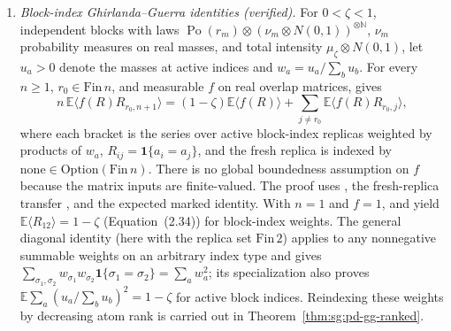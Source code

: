 \begin{remark}
\begin{enumerate}
\item \emph{Block-index Ghirlanda--Guerra identities (verified).} For $0<\zeta<1$, independent blocks with laws $\operatorname{Po}(r_m)\otimes(\nu_m\otimes N(0,1))^{\otimes\mathbb N}$, $\nu_m$ probability measures on real masses, and total intensity $\mu_\zeta\otimes N(0,1)$, let $u_a>0$ denote the masses at active indices and $w_a=u_a/\sum_bu_b$. For every $n\geq1$, $r_0\in\mathrm{Fin}\,n$, and measurable $f$ on real overlap matrices,  gives
\[
n\,\mathbb E\langle f(R)R_{r_0,n+1}\rangle=(1-\zeta)\mathbb E\langle f(R)\rangle+\sum_{j\ne r_0}\mathbb E\langle f(R)R_{r_0,j}\rangle,
\]
where each bracket is the series over active block-index replicas weighted by products of $w_a$, $R_{ij}=\mathbf 1\{a_i=a_j\}$, and the fresh replica is indexed by $\mathrm{none}\in\mathrm{Option}(\mathrm{Fin}\,n)$. There is no global boundedness assumption on $f$ because the matrix inputs are finite-valued. The proof uses , the fresh-replica transfer , and the expected marked identity. With $n=1$ and $f=1$,  and  yield $\mathbb E\langle R_{12}\rangle=1-\zeta$ (Equation~(2.34)) for block-index weights. The general diagonal identity  (here with the replica set $\mathrm{Fin}\,2$) applies to any nonnegative summable weights on an arbitrary index type and gives $\sum_{\sigma_1,\sigma_2}w_{\sigma_1}w_{\sigma_2}\mathbf 1\{\sigma_1=\sigma_2\}=\sum_aw_a^2$; its specialization  also proves $\mathbb E\sum_a(u_a/\sum_bu_b)^2=1-\zeta$ for active block indices. Reindexing these weights by decreasing atom rank is carried out in Theorem~\ref{thm:sg:pd-gg-ranked}.

\end{enumerate}
\end{remark}
